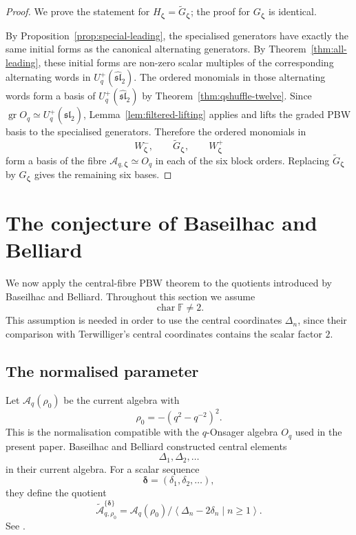 \documentclass[11pt]{extarticle}
\theoremstyle{definition}
\theoremstyle{remark}
\numberwithin{equation}{section}
\newcommand{\F}{\mathbb F}
\newcommand{\Oq}{O_q}
\newcommand{\Aq}{\mathcal A_q}
\newcommand{\Aqfib}[1]{\mathcal A_{q,#1}}
\newcommand{\BBqquot}[2]{\widetilde{\mathcal A}_{q,#1}^{\{#2\}}}
\newcommand{\Uplus}{U_q^+(\widehat{\mathfrak{sl}}_2)}
\newcommand{\gr}{\operatorname{gr}}
\begin{document}
\begin{proof}
We prove the statement for
\(H_{\boldsymbol\zeta}=\widetilde G_{\boldsymbol\zeta}\); the proof for
\(G_{\boldsymbol\zeta}\) is identical.

By Proposition~\ref{prop:special-leading}, the specialised generators have
exactly the same initial forms as the canonical alternating generators.
By Theorem~\ref{thm:all-leading}, these initial forms are non-zero scalar
multiples of the corresponding alternating words in \(\Uplus\).  The
ordered monomials in those alternating words form a basis of \(\Uplus\) by
Theorem~\ref{thm:qshuffle-twelve}.  Since
\(\gr\Oq\simeq\Uplus\), Lemma~\ref{lem:filtered-lifting} applies and lifts
the graded PBW basis to the specialised generators.  Therefore the ordered
monomials in
\[
        W^-_{\boldsymbol\zeta},\qquad
        \widetilde G_{\boldsymbol\zeta},\qquad
        W^+_{\boldsymbol\zeta}
\]
form a basis of the fibre \(\Aqfib{\boldsymbol\zeta}\simeq\Oq\) in each of
the six block orders.  Replacing \(\widetilde G_{\boldsymbol\zeta}\) by
\(G_{\boldsymbol\zeta}\) gives the remaining six bases.
\end{proof}


\section{The conjecture of Baseilhac and Belliard}
\label{sec:BB}

We now apply the central-fibre PBW theorem to the quotients introduced by
Baseilhac and Belliard.  Throughout this section we assume
\[
        \operatorname{char}\F\neq2 .
\]
This assumption is needed in order to use the central coordinates
\(\Delta_n\), since their comparison with Terwilliger's central coordinates
contains the scalar factor \(2\).

\subsection{The normalised parameter}

Let \(\Aq(\rho_0)\) be the current algebra with
\[
        \rho_0=-(q^2-q^{-2})^2 .
\]
This is the normalisation compatible with the \(q\)-Onsager algebra
\(\Oq\) used in the present paper.  Baseilhac and Belliard constructed
central elements
\[
        \Delta_1,\Delta_2,\ldots
\]
in their current algebra.  For a scalar sequence
\[
        \boldsymbol\delta=(\delta_1,\delta_2,\ldots),
\]
they define the quotient
\begin{equation}
\label{eq:BB-quotient-normalised}
\BBqquot{\rho_0}{\boldsymbol\delta}
 =
 \Aq(\rho_0)/
 \left\langle
        \Delta_n-2\delta_n\mid n\geq1
 \right\rangle .
\end{equation}
See \cite[Definition~3.1]{BaseilhacBelliard2017}.
\end{document}
